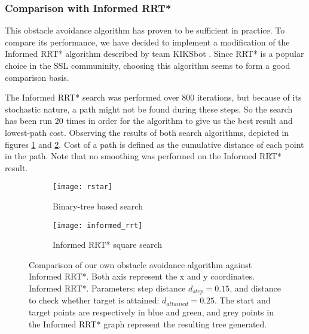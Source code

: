 \subsubsection{Comparison with Informed RRT*}
This obstacle avoidance algorithm has proven to be sufficient in practice. To compare its performance, we have decided to implement
a modification of the Informed RRT* algorithm described by team KIKSbot \cite{tdp_kiksbot_2023}. Since RRT* is a popular choice in the SSL communinity,
choosing this algorithm seems to form a good comparison basis.

The Informed RRT* search was performed over 800 iterations, but because of its stochastic nature, a path might not be found
during these steps. So the search has been run 20 times in order for the algorithm to give us the best result and lowest-path cost.
Observing the results of both search algorithms, depicted in figures \ref{fig:own-obs-avoid} and \ref{fig:informed-rrt-star}.
Cost of a path is defined as the cumulative distance of each point in the path. Note that no smoothing was performed on the Informed RRT* result.

\begin{figure}[h]
    \centering
    \begin{subfigure}[c][][c]{0.4\linewidth}
        \texttt{[image: rstar]}
        \caption{Binary-tree based search}
        \label{fig:own-obs-avoid}
    \end{subfigure}
    \hfill
    \begin{subfigure}[c][][c]{0.4\linewidth}
        \texttt{[image: informed\_rrt]}
        \caption{Informed RRT* square search}
        \label{fig:informed-rrt-star}
    \end{subfigure}
    \label{fig:avoidance}
    \caption{Comparison of our own obstacle avoidance algorithm against Informed RRT*. Both axis represent the x and y coordinates.
    Informed RRT*. Parameters: step distance $d_{step} = 0.15$, and distance to check whether target is attained: $d_{attained} = 0.25$.
    The start and target points are respectively in blue and green,
    and grey points in the Informed RRT* graph represent the resulting tree generated.}
\end{figure}
